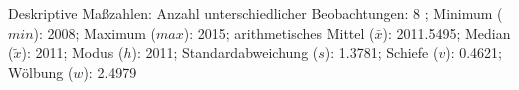 				\label{tableValues:bocc242b_v1}
				\vspace*{-\baselineskip}
                    \begin{noten}
                	    \note{} Deskriptive Maßzahlen:
                	    Anzahl unterschiedlicher Beobachtungen: 8%
                	    ; 
                	      Minimum ($min$): 2008; 
                	      Maximum ($max$): 2015; 
                	      arithmetisches Mittel ($\bar{x}$): \num[round-mode=places,round-precision=2]{2011.5495}; 
                	      Median ($\tilde{x}$): 2011; 
                	      Modus ($h$): 2011; 
                	      Standardabweichung ($s$): \num[round-mode=places,round-precision=2]{1.3781}; 
                	      Schiefe ($v$): \num[round-mode=places,round-precision=2]{0.4621}; 
                	      Wölbung ($w$): \num[round-mode=places,round-precision=2]{2.4979}
                     \end{noten}

